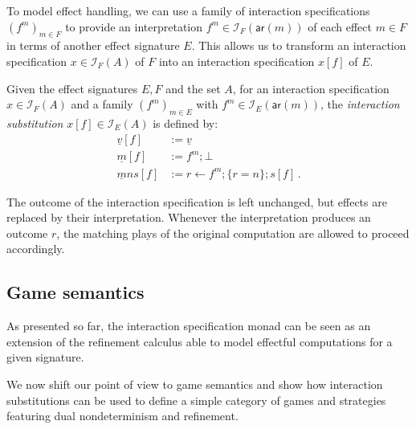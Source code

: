 \documentclass[format=sigplan,authordraft]{acmart}
\newcommand{\kw}[1]{\ensuremath{ \mathsf{#1} }}
\begin{document}
To model effect handling,
we can use a family of interaction specifications
$(f^m)_{m \in F}$
to provide an interpretation $f^m \in \mathcal{I}_F(\kw{ar}(m))$
of each effect $m \in F$
in terms of another effect signature $E$.
This allows us to transform an interaction specification
$x \in \mathcal{I}_F(A)$ of $F$
into an interaction specification
$x[f]$ of $E$.

\begin{definition}
Given the effect signatures $E, F$ and the set $A$,
for an interaction specification $x \in \mathcal{I}_F(A)$
and a family $(f^m)_{m \in E}$ with $f^m \in \mathcal{I}_E(\kw{ar}(m))$,
the \emph{interaction substitution} $x[f] \in \mathcal{I}_E(A)$
is defined by:
\begin{align*}
  \underline{v}[f] &:= \underline{v} \\
  \underline{m}[f] &:= f^m ; \bot \\
  \underline{m}ns[f] &:= r \leftarrow f^m ; \{r = n\} ; s[f] \,.
\end{align*}
\end{definition}

The outcome of the interaction specification is left unchanged,
but effects are replaced by their interpretation.
Whenever the interpretation produces an outcome $r$,
the matching plays of the original computation
are allowed to proceed accordingly.


\subsection{Game semantics} %

As presented so far,
the interaction specification monad
can be seen as an extension of the refinement calculus
able to model effectful computations
for a given signature.

We now shift our point of view to game semantics
and show how interaction substitutions
can be used to define a simple category of games and strategies
featuring dual nondeterminism and refinement.
\end{document}
